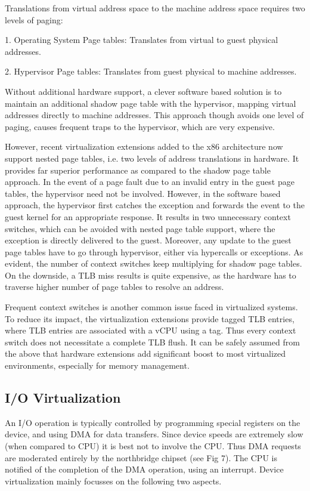 Translations from virtual address space to the machine address space requires two levels of paging: 

1. Operating System Page tables: Translates from virtual to guest physical addresses.

2. Hypervisor Page tables: Translates from guest physical to machine addresses.

Without additional hardware support, a clever software based solution is to maintain an additional shadow page table with the hypervisor, mapping virtual addresses directly to machine addresses. This approach though avoids one level of paging, causes frequent traps to the hypervisor, which are very expensive. 

However, recent virtualization extensions added to the x86 architecture now support nested page tables, i.e. two levels of address translations in hardware. It provides far superior performance as compared to the shadow page table approach. In the event of a page fault due to an invalid entry in the guest page tables, the hypervisor need not be involved. However, in the software based approach, the hypervisor first catches the exception and forwards the event to the guest kernel for an appropriate response. It results in two unnecessary context switches, which can be avoided with nested page table support, where the exception is directly delivered to the guest. Moreover, any update to the guest page tables have to go through hypervisor, either via hypercalls or exceptions. As evident, the number of context switches keep multiplying for shadow page tables. On the downside, a TLB miss results is quite expensive, as the hardware has to traverse higher number of page tables to resolve an address. 

Frequent context switches is another common issue faced in virtualized systems. To reduce its impact, the virtualization extensions provide tagged TLB entries, where TLB entries are associated with a vCPU using a tag. Thus every context switch does not necessitate a complete TLB flush. It can be safely assumed from the above that hardware extensions add significant boost to most virtualized environments, especially for memory management.

\subsection{I/O Virtualization}

An I/O operation is typically controlled by programming special registers on the device, and using DMA for data transfers. Since device speeds are extremely slow (when compared to CPU) it is best not to involve the CPU. Thus DMA requests are moderated entirely by the northbridge chipset (see Fig 7). The CPU is notified of the completion of the DMA operation, using an interrupt. Device virtualization mainly focusses on the following two aspects. 

